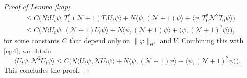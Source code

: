 \documentclass[11pt,a4paper,draft,DIV11]{scrartcl}	%
\newcommand{\N}{\mathcal{N}}
\begin{document}
\begin{proof}[Proof of Lemma \ref{l:ap}]
\begin{align*}
    & \le C \Big( N \langle U_t \psi, T_t^* (\N+1) T_t U_t \psi \rangle + N
    \langle \psi, (\N+1) \psi \rangle + \langle \psi, T^*_0 \N^2 T_0 \psi \rangle
    \Big) \\
    & \le C \Big( N \langle U_t \psi, (\N+1) U_t \psi \rangle + N \langle
    \psi, (\N+1) \psi \rangle + \langle \psi, (\N+1)^2 \psi \rangle \Big),
  \end{align*}
  for some constants $C$ that depend only on $\| \varphi \|_{H^1}$
  and $V$. Combining this with \eqref{ep4}, we obtain
  \begin{displaymath}
    \langle U_t \psi, \N^2 U_t \psi \rangle 
     \le C \Big( N \langle U_t \psi, \N U_t \psi \rangle + N \langle
    \psi, (\N+1) \psi \rangle + \langle \psi, (\N+1)^2 \psi \rangle \Big).
  \end{displaymath}
  This concludes the proof.
\end{proof}
\end{document}
